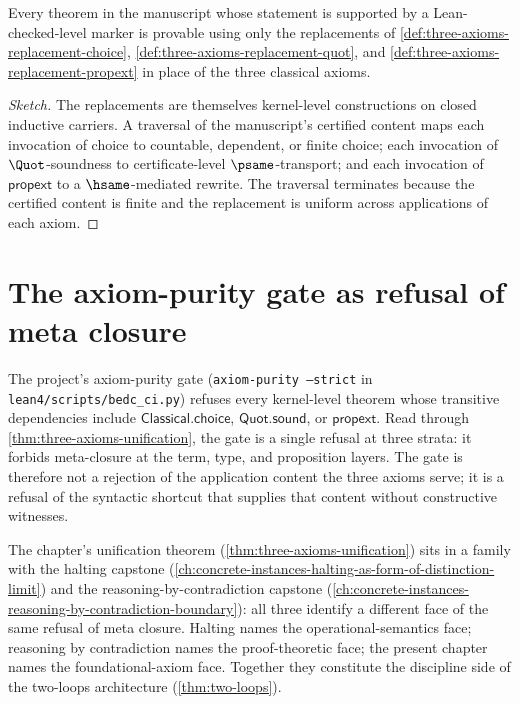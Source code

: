 \begin{theorem}
\label{thm:three-axioms-replacements-suffice}
Every theorem in the manuscript whose statement is supported by a Lean-checked-level marker is provable using only the replacements of \autoref{def:three-axioms-replacement-choice}, \autoref{def:three-axioms-replacement-quot}, and \autoref{def:three-axioms-replacement-propext} in place of the three classical axioms.
\end{theorem}

\begin{proof}[Sketch]
The replacements are themselves kernel-level constructions on closed inductive carriers. A traversal of the manuscript's certified content maps each invocation of choice to countable, dependent, or finite choice; each invocation of $\Quot$-soundness to certificate-level $\psame$-transport; and each invocation of $\mathsf{propext}$ to a $\hsame$-mediated rewrite. The traversal terminates because the certified content is finite and the replacement is uniform across applications of each axiom.
\end{proof}

\section{The axiom-purity gate as refusal of meta closure}
\label{sec:three-axioms-purity-gate}

\begin{remark}
\label{rem:three-axioms-gate-meaning}
The project's axiom-purity gate (\texttt{axiom-purity --strict} in \texttt{lean4/scripts/bedc\_ci.py}) refuses every kernel-level theorem whose transitive dependencies include $\mathsf{Classical.choice}$, $\mathsf{Quot.sound}$, or $\mathsf{propext}$. Read through \autoref{thm:three-axioms-unification}, the gate is a single refusal at three strata: it forbids meta-closure at the term, type, and proposition layers. The gate is therefore not a rejection of the application content the three axioms serve; it is a refusal of the syntactic shortcut that supplies that content without constructive witnesses.
\end{remark}

\begin{remark}
\label{rem:three-axioms-siblings}
The chapter's unification theorem (\autoref{thm:three-axioms-unification}) sits in a family with the halting capstone (\autoref{ch:concrete-instances-halting-as-form-of-distinction-limit}) and the reasoning-by-contradiction capstone (\autoref{ch:concrete-instances-reasoning-by-contradiction-boundary}): all three identify a different face of the same refusal of meta closure. Halting names the operational-semantics face; reasoning by contradiction names the proof-theoretic face; the present chapter names the foundational-axiom face. Together they constitute the discipline side of the two-loops architecture (\autoref{thm:two-loops}).
\end{remark}

